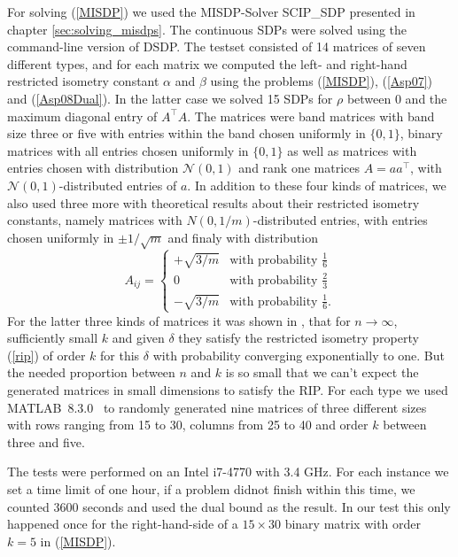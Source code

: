 \documentclass[a4paper,11pt,1p]{elsarticle}
\newcommand{\T}{^{\top}}
\begin{document}
For solving (\ref{MISDP}) we used the MISDP-Solver SCIP\_SDP presented in chapter \ref{sec:solving_misdps}. The continuous SDPs were solved using the command-line version of DSDP. The testset consisted of 14 matrices of seven 
different types, and for each matrix we computed the left- and right-hand restricted isometry constant $\alpha$ and $\beta$ using the problems (\ref{MISDP}), (\ref{Asp07}) and (\ref{Asp08Dual}). In the latter case we solved 15 
SDPs for $\rho$ between $0$ and the maximum diagonal entry of $A\T A$. The matrices were band matrices with band size three or five with entries within the band chosen uniformly in $\{0,1\}$, binary matrices with all entries chosen 
uniformly in $\{0,1\}$ as well as matrices with entries chosen with distribution $\mathcal{N}(0,1)$ and rank one matrices $A = aa\T$, with $\mathcal{N}(0,1)$-distributed entries of $a$. In addition to these four kinds of matrices, 
we also used three more with theoretical results about their restricted isometry constants, namely matrices with $N(0, 1/m)$-distributed entries, with entries chosen uniformly in $\pm 1/\sqrt{m}$ and finaly with distribution
\begin{equation}\nonumber
A_{ij} = \begin{cases} + \sqrt{3/m} & \text{with probability } \frac{1}{6} \\ 0 & \text{with probability } \frac{2}{3} \\ - \sqrt{3/m} & \text{with probability } \frac{1}{6}. \end{cases}
\end{equation}
For the latter three kinds of matrices it was shown in \cite{BDDW08}, that for $n \rightarrow \infty$, sufficiently small $k$ and given $\delta$ they satisfy the restricted isometry property (\ref{rip}) of order $k$ for this $\delta$
with probability converging exponentially to one. But the needed proportion between $n$ and $k$ is so small that we can't expect the generated matrices in small dimensions to satisfy the RIP. For each type we used \mbox{MATLAB 8.3.0 
\cite{MAT}} to randomly generated nine matrices of three different sizes with rows ranging from 15 to 30, columns from 25 to 40 and order $k$ between three and five.

The tests were performed on an Intel i7-4770 with 3.4 GHz. For each instance we set a time limit of one hour, if a problem didnot finish within this time, we counted 3600 seconds and used the dual bound as the result. In our test this
only happened once for the right-hand-side of a $15 \times 30$ binary matrix with order $k=5$ in (\ref{MISDP}). 
\end{document}
